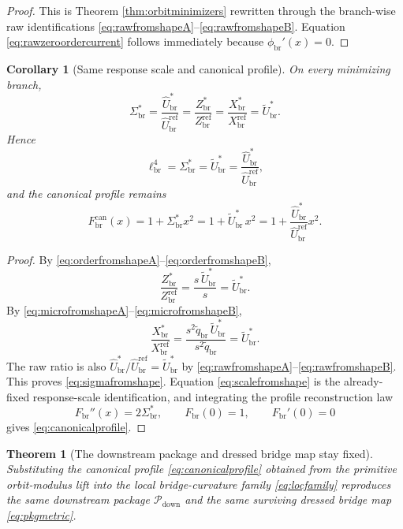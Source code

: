 \documentclass[11pt]{article}
\newcommand{\CurvScale}{\ell_{\mathrm{br}}}
\newcommand{\CurvProfile}{F_{\mathrm{br}}}
\newcommand{\CurvProfileCan}{F_{\mathrm{br}}^{\mathrm{can}}}
\newcommand{\DownPkg}{\mathscr P_{\mathrm{down}}}
\newcommand{\RespSusEq}{\Sigma_{\mathrm{br}}^{\ast}}
\newcommand{\RespMicroRef}{X_{\mathrm{br}}^{\mathrm{ref}}}
\newcommand{\RespMicroEq}{X_{\mathrm{br}}^{\ast}}
\newcommand{\RespOrderRef}{Z_{\mathrm{br}}^{\mathrm{ref}}}
\newcommand{\RespOrderEq}{Z_{\mathrm{br}}^{\ast}}
\newcommand{\RespVacPhase}{\phi_{\mathrm{br}}}
\newcommand{\RespRawRef}{\widehat U_{\mathrm{br}}^{\mathrm{ref}}}
\newcommand{\RespRawEq}{\widehat U_{\mathrm{br}}^{\ast}}
\newcommand{\RespShapeReadout}{\widetilde q_{\mathrm{br}}}
\newcommand{\RespShapeEq}{\widetilde U_{\mathrm{br}}^{\ast}}
\newtheorem{corollary}{Corollary}
\newtheorem{theorem}{Theorem}
\begin{document}
\begin{proof}
This is Theorem \ref{thm:orbitminimizers} rewritten through the branch-wise raw identifications \eqref{eq:rawfromshapeA}--\eqref{eq:rawfromshapeB}. Equation \eqref{eq:rawzeroordercurrent} follows immediately because \(\RespVacPhase'(x)=0\).
\end{proof}

\begin{corollary}[Same response scale and canonical profile]
\label{cor:sameprofile}
On every minimizing branch,
\begin{equation}
\RespSusEq
=
\frac{\RespRawEq}{\RespRawRef}
=
\frac{\RespOrderEq}{\RespOrderRef}
=
\frac{\RespMicroEq}{\RespMicroRef}
=
\RespShapeEq.
\label{eq:sigmafromshape}
\end{equation}
Hence
\begin{equation}
\CurvScale^4=\RespSusEq=\RespShapeEq=\frac{\RespRawEq}{\RespRawRef},
\label{eq:scalefromshape}
\end{equation}
and the canonical profile remains
\begin{equation}
\CurvProfileCan(x)=1+\RespSusEq x^2=1+\RespShapeEq\,x^2=1+\frac{\RespRawEq}{\RespRawRef}x^2.
\label{eq:canonicalprofile}
\end{equation}
\end{corollary}

\begin{proof}
By \eqref{eq:orderfromshapeA}--\eqref{eq:orderfromshapeB},
\[
\frac{\RespOrderEq}{\RespOrderRef}=\frac{s\,\RespShapeEq}{s}=\RespShapeEq.
\]
By \eqref{eq:microfromshapeA}--\eqref{eq:microfromshapeB},
\[
\frac{\RespMicroEq}{\RespMicroRef}
=
\frac{s^2\RespShapeReadout\,\RespShapeEq}{s^2\RespShapeReadout}
=
\RespShapeEq.
\]
The raw ratio is also \(\RespRawEq/\RespRawRef=\RespShapeEq\) by \eqref{eq:rawfromshapeA}--\eqref{eq:rawfromshapeB}. This proves \eqref{eq:sigmafromshape}. Equation \eqref{eq:scalefromshape} is the already-fixed response-scale identification, and integrating the profile reconstruction law
\[
\CurvProfile''(x)=2\RespSusEq,
\qquad
\CurvProfile(0)=1,
\qquad
\CurvProfile'(0)=0
\]
gives \eqref{eq:canonicalprofile}.
\end{proof}

\begin{theorem}[The downstream package and dressed bridge map stay fixed]
\label{thm:fixedpackage}
Substituting the canonical profile \eqref{eq:canonicalprofile} obtained from the primitive orbit-modulus lift into the local bridge-curvature family \eqref{eq:locfamily} reproduces the same downstream package \(\DownPkg\) and the same surviving dressed bridge map \eqref{eq:pkgmetric}.
\end{theorem}
\end{document}
